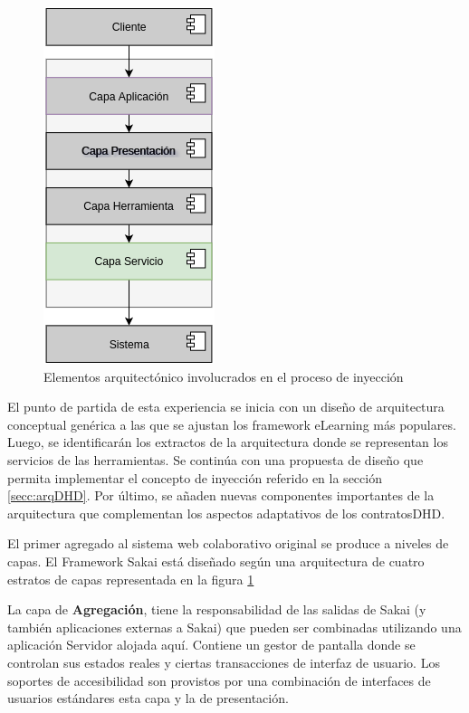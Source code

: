 \begin{figure}
\begin{center}
\includegraphics[width=2.5 in,totalheight=3 in]{Ch2/felo.png}
\caption{Elementos arquitectónico involucrados en el proceso de inyección} \label{fig:FeLO}
\end{center}
\end{figure} 


El punto de partida de esta experiencia se inicia con un diseño de arquitectura conceptual genérica a las que se ajustan los framework eLearning más populares. Luego, se identificarán los extractos de la arquitectura donde se representan los servicios de las herramientas. Se continúa con una propuesta de diseño que permita implementar el concepto de inyección referido en la sección \ref{secc:arqDHD}. Por último, se añaden nuevas componentes importantes de la arquitectura que complementan los aspectos adaptativos de los contratosDHD.  


El primer agregado al sistema web colaborativo original se produce a niveles de capas. El Framework Sakai está diseñado según una arquitectura de cuatro estratos de capas representada en la figura \ref{fig:FeLO}

La capa de \textbf{Agregación}, tiene la responsabilidad de las salidas de Sakai (y también aplicaciones externas a Sakai) que pueden ser combinadas utilizando una aplicación Servidor alojada aquí. Contiene un gestor de pantalla donde se controlan sus estados reales y ciertas transacciones de interfaz de usuario. Los soportes de accesibilidad son provistos por una combinación de interfaces de usuarios estándares esta capa y la de presentación.

